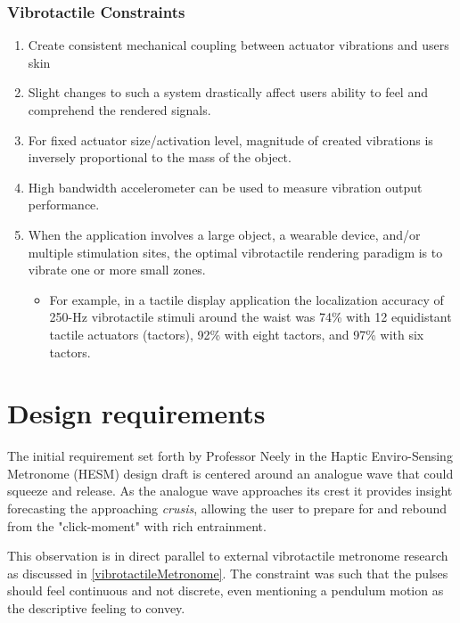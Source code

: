 \subsubsection{Vibrotactile Constraints}
\begin{enumerate}
    \item Create consistent mechanical coupling between actuator vibrations and users skin
    \item Slight changes to such a system drastically affect users ability to feel and comprehend the rendered signals.
    \item For fixed actuator size/activation level, magnitude of created vibrations is inversely proportional to the mass of the object.
    \item High bandwidth accelerometer can be used to measure vibration output performance. \cite{ignoto2017development}
    \item When the application involves a large object, a wearable device, and/or multiple stimulation sites, the optimal vibrotactile rendering paradigm is to vibrate one or more small zones. 
    \begin{itemize}
    \item For example, in a tactile display application the localization accuracy of 250-Hz vibrotactile stimuli around the waist was 74\% with 12 equidistant tactile actuators (tactors), 92\% with eight tactors, and 97\% with six tactors.\cite{choi2013vibrotactile}	
    \end{itemize}
\end{enumerate}

\section{Design requirements}

The initial requirement set forth by Professor Neely in the Haptic Enviro-Sensing Metronome (HESM) design draft is centered around an analogue wave that could squeeze and release. As the analogue wave approaches its crest it provides insight forecasting the approaching \textit{crusis}, allowing the user to prepare for and rebound from the "click-moment" with rich entrainment. 

This observation is in direct parallel to external vibrotactile metronome research as discussed in \ref{vibrotactileMetronome}. The constraint was such that the pulses should feel continuous and not discrete, even mentioning a pendulum motion as the descriptive feeling to convey. 

